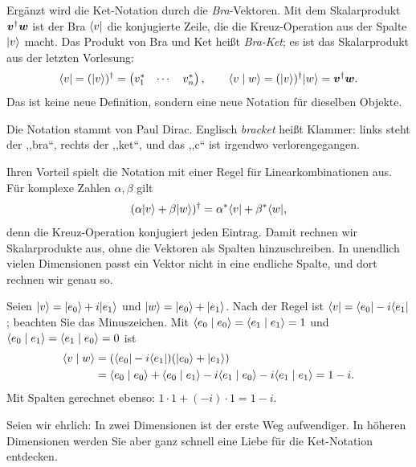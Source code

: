 Ergänzt wird die Ket-Notation durch die \emph{Bra}-Vektoren. Mit dem Skalarprodukt $\boldsymbol{v}^{\dagger}\boldsymbol{w}$ ist der Bra $\langle v \rvert$ die konjugierte Zeile, die die Kreuz-Operation aus der Spalte $\lvert v \rangle$ macht. Das Produkt von Bra und Ket heißt \emph{Bra-Ket}; es ist das Skalarprodukt aus der letzten Vorlesung:
\begin{equation}
	\langle v \rvert = (\lvert v \rangle)^{\dagger} = \begin{pmatrix} v_1^* & \cdots & v_n^* \end{pmatrix}, \qquad
	\langle v \mid w \rangle = (\lvert v \rangle)^{\dagger}\lvert w \rangle = \boldsymbol{v}^{\dagger}\boldsymbol{w}.
\end{equation}
Das ist keine neue Definition, sondern eine neue Notation für dieselben Objekte.

\begin{historical}
	Die Notation stammt von Paul Dirac. Englisch \emph{bracket} heißt Klammer: links steht der ,,bra``, rechts der ,,ket``, und das ,,c`` ist irgendwo verlorengegangen.
\end{historical}

Ihren Vorteil spielt die Notation mit einer Regel für Linearkombinationen aus. Für komplexe Zahlen $\alpha,\beta$ gilt
\begin{equation}
	(\alpha\lvert v \rangle + \beta\lvert w \rangle)^{\dagger} = \alpha^*\langle v \rvert + \beta^*\langle w \rvert,
\end{equation}
denn die Kreuz-Operation konjugiert jeden Eintrag. Damit rechnen wir Skalarprodukte aus, ohne die Vektoren als Spalten hinzuschreiben. In unendlich vielen Dimensionen passt ein Vektor nicht in eine endliche Spalte, und dort rechnen wir genau so.

\begin{beispiel}
	Seien $\lvert v \rangle = \lvert e_0 \rangle + i\lvert e_1 \rangle$ und $\lvert w \rangle = \lvert e_0 \rangle + \lvert e_1 \rangle$. Nach der Regel ist $\langle v \rvert = \langle e_0 \rvert - i\langle e_1 \rvert$; beachten Sie das Minuszeichen. Mit $\langle e_0 \mid e_0 \rangle = \langle e_1 \mid e_1 \rangle = 1$ und $\langle e_0 \mid e_1 \rangle = \langle e_1 \mid e_0 \rangle = 0$ ist
	\begin{equation}
		\begin{split}
			\langle v \mid w \rangle &= (\langle e_0 \rvert - i\langle e_1 \rvert)(\lvert e_0 \rangle + \lvert e_1 \rangle) \\
			&= \langle e_0 \mid e_0 \rangle + \langle e_0 \mid e_1 \rangle - i\langle e_1 \mid e_0 \rangle - i\langle e_1 \mid e_1 \rangle = 1 - i.
		\end{split}
	\end{equation}
	Mit Spalten gerechnet ebenso: $1\cdot 1 + (-i)\cdot 1 = 1 - i$.
\end{beispiel}

Seien wir ehrlich: In zwei Dimensionen ist der erste Weg aufwendiger. In höheren Dimensionen werden Sie aber ganz schnell eine Liebe für die Ket-Notation entdecken.


